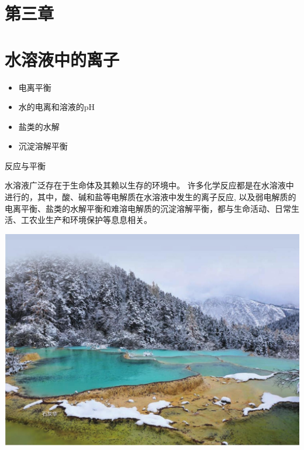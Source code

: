 \documentclass[10pt]{article}
\begin{document}
\section*{第三章}

\section*{水溶液中的离子}

\begin{mdframed}

\begin{itemize}
\item 电离平衡
\end{itemize}

\begin{itemize}
\item 水的电离和溶液的pH
\end{itemize}

\begin{itemize}
\item 盐类的水解
\end{itemize}

\begin{itemize}
\item 沉淀溶解平衡
\end{itemize}

\end{mdframed}

反应与平衡

水溶液广泛存在于生命体及其赖以生存的环境中。 许多化学反应都是在水溶液中进行的，其中，酸、碱和盐等电解质在水溶液中发生的离子反应, 以及弱电解质的电离平衡、盐类的水解平衡和难溶电解质的沉淀溶解平衡，都与生命活动、日常生活、工农业生产和环境保护等息息相关。

\begin{center}
\includegraphics[max width=1.0\textwidth]{images/0190da9d-8bfd-732f-bc2c-0b21d0f13b91_62_614630.jpg}
\end{center}
\end{document}
